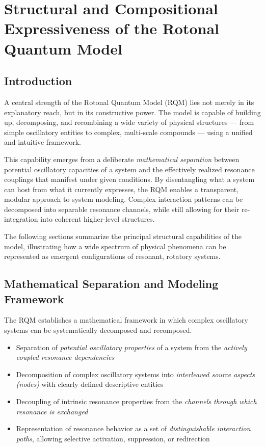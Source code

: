 
\chapter{Structural and Compositional Expressiveness of the Rotonal Quantum Model}
\label{ch:rqm-expressiveness}

\section{Introduction}

A central strength of the Rotonal Quantum Model (RQM) lies not merely in its explanatory reach, but in its constructive power. The model is capable of building up, decomposing, and recombining a wide variety of physical structures --- from simple oscillatory entities to complex, multi-scale compounds --- using a unified and intuitive framework.

This capability emerges from a deliberate \emph{mathematical separation} between potential oscillatory capacities of a system and the effectively realized resonance couplings that manifest under given conditions. By disentangling what a system can host from what it currently expresses, the RQM enables a transparent, modular approach to system modeling. Complex interaction patterns can be decomposed into separable resonance channels, while still allowing for their re-integration into coherent higher-level structures.

The following sections summarize the principal structural capabilities of the model, illustrating how a wide spectrum of physical phenomena can be represented as emergent configurations of resonant, rotatory systems.

\section{Mathematical Separation and Modeling Framework}

The RQM establishes a mathematical framework in which complex oscillatory systems can be systematically decomposed and recomposed.

\begin{itemize}
  \item Separation of \emph{potential oscillatory properties} of a system from the \emph{actively coupled resonance dependencies}
  \item Decomposition of complex oscillatory systems into \emph{interleaved source aspects (nodes)} with clearly defined descriptive entities
  \item Decoupling of intrinsic resonance properties from the \emph{channels through which resonance is exchanged}
  \item Representation of resonance behavior as a set of \emph{distinguishable interaction paths}, allowing selective activation, suppression, or redirection
\end{itemize}

